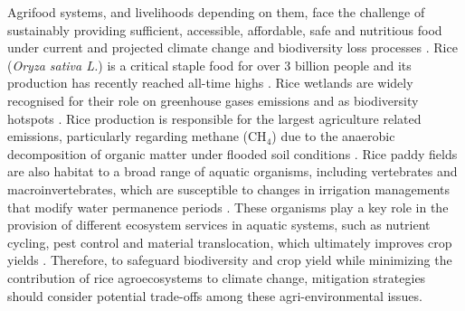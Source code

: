 Agrifood systems, and livelihoods depending on them, face the challenge of sustainably providing sufficient, accessible, affordable, safe and nutritious food under current and projected climate change and biodiversity loss processes \citep{fao2022b}. Rice (\textit{Oryza sativa L.}) is a critical staple food for over 3 billion people and its production has recently reached all-time highs \citep{fao2022a, fao2023}. Rice wetlands are widely recognised for their role on greenhouse gases emissions \citep{mitsch2013, mitsch2018} and as biodiversity hotspots \citep{katayama2019}. Rice production is responsible for the largest agriculture related emissions, particularly regarding methane (CH$_{4}$) \citep{schaefer2016, wang2023} due to the anaerobic decomposition of organic matter under flooded soil conditions \citep{burke1990}. Rice paddy fields are also habitat to a broad range of aquatic organisms, including vertebrates and macroinvertebrates, which are susceptible to changes in irrigation managements that modify water permanence periods \citep{lupi2013}. These organisms play a key role in the provision of different ecosystem services in aquatic systems, such as nutrient cycling, pest control and material translocation, which ultimately improves crop yields \citep{nicholls1998, wallace1996, prather2013}. Therefore, to safeguard biodiversity and crop yield while minimizing the contribution of rice agroecosystems to climate change, mitigation strategies should consider potential trade-offs among these agri-environmental issues.\\

